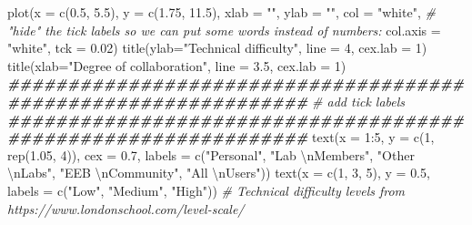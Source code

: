 \documentclass[
  11pt,
]{article}
\newenvironment{Shaded}{\begin{snugshade}}{\end{snugshade}}
\newcommand{\AttributeTok}[1]{\textcolor[rgb]{0.77,0.63,0.00}{#1}}
\newcommand{\CommentTok}[1]{\textcolor[rgb]{0.56,0.35,0.01}{\textit{#1}}}
\newcommand{\DecValTok}[1]{\textcolor[rgb]{0.00,0.00,0.81}{#1}}
\newcommand{\DocumentationTok}[1]{\textcolor[rgb]{0.56,0.35,0.01}{\textbf{\textit{#1}}}}
\newcommand{\FloatTok}[1]{\textcolor[rgb]{0.00,0.00,0.81}{#1}}
\newcommand{\FunctionTok}[1]{\textcolor[rgb]{0.00,0.00,0.00}{#1}}
\newcommand{\NormalTok}[1]{#1}
\newcommand{\SpecialCharTok}[1]{\textcolor[rgb]{0.00,0.00,0.00}{#1}}
\newcommand{\StringTok}[1]{\textcolor[rgb]{0.31,0.60,0.02}{#1}}
\begin{document}
\begin{Shaded}
\begin{Highlighting}[]
\FunctionTok{plot}\NormalTok{(}\AttributeTok{x =} \FunctionTok{c}\NormalTok{(}\FloatTok{0.5}\NormalTok{, }\FloatTok{5.5}\NormalTok{),}
     \AttributeTok{y =} \FunctionTok{c}\NormalTok{(}\FloatTok{1.75}\NormalTok{, }\FloatTok{11.5}\NormalTok{),}
     \AttributeTok{xlab =} \StringTok{""}\NormalTok{,}
     \AttributeTok{ylab =} \StringTok{""}\NormalTok{,}
     \AttributeTok{col =} \StringTok{"white"}\NormalTok{,}
     \CommentTok{\# "hide" the tick labels so we can put some words instead of numbers:}
     \AttributeTok{col.axis =} \StringTok{"white"}\NormalTok{,}
     \AttributeTok{tck =} \FloatTok{0.02}\NormalTok{)}
\FunctionTok{title}\NormalTok{(}\AttributeTok{ylab=}\StringTok{"Technical difficulty"}\NormalTok{, }\AttributeTok{line =} \DecValTok{4}\NormalTok{, }\AttributeTok{cex.lab =} \DecValTok{1}\NormalTok{)}
\FunctionTok{title}\NormalTok{(}\AttributeTok{xlab=}\StringTok{"Degree of collaboration"}\NormalTok{, }\AttributeTok{line =} \FloatTok{3.5}\NormalTok{, }\AttributeTok{cex.lab =} \DecValTok{1}\NormalTok{)}
\DocumentationTok{\#\#\#\#\#\#\#\#\#\#\#\#\#\#\#\#\#\#\#\#\#\#\#\#\#\#\#\#\#\#\#\#\#\#\#\#\#\#\#\#\#\#\#\#\#\#\#\#\#\#\#\#\#\#\#\#\#\#\#\#\#\#\#}
\CommentTok{\# add tick labels}
\DocumentationTok{\#\#\#\#\#\#\#\#\#\#\#\#\#\#\#\#\#\#\#\#\#\#\#\#\#\#\#\#\#\#\#\#\#\#\#\#\#\#\#\#\#\#\#\#\#\#\#\#\#\#\#\#\#\#\#\#\#\#\#\#\#\#\#}
\FunctionTok{text}\NormalTok{(}\AttributeTok{x =} \DecValTok{1}\SpecialCharTok{:}\DecValTok{5}\NormalTok{,}
     \AttributeTok{y =} \FunctionTok{c}\NormalTok{(}\DecValTok{1}\NormalTok{, }\FunctionTok{rep}\NormalTok{(}\FloatTok{1.05}\NormalTok{, }\DecValTok{4}\NormalTok{)),}
     \AttributeTok{cex =} \FloatTok{0.7}\NormalTok{,}
     \AttributeTok{labels =} \FunctionTok{c}\NormalTok{(}\StringTok{"Personal"}\NormalTok{,}
                \StringTok{"Lab }\SpecialCharTok{\textbackslash{}n}\StringTok{Members"}\NormalTok{,}
                \StringTok{"Other }\SpecialCharTok{\textbackslash{}n}\StringTok{Labs"}\NormalTok{,}
                \StringTok{"EEB }\SpecialCharTok{\textbackslash{}n}\StringTok{Community"}\NormalTok{,}
                \StringTok{"All }\SpecialCharTok{\textbackslash{}n}\StringTok{Users"}\NormalTok{))}
\FunctionTok{text}\NormalTok{(}\AttributeTok{x =} \FunctionTok{c}\NormalTok{(}\DecValTok{1}\NormalTok{, }\DecValTok{3}\NormalTok{, }\DecValTok{5}\NormalTok{),}
     \AttributeTok{y =} \FloatTok{0.5}\NormalTok{,}
     \AttributeTok{labels =} \FunctionTok{c}\NormalTok{(}\StringTok{"Low"}\NormalTok{, }\StringTok{"Medium"}\NormalTok{, }\StringTok{"High"}\NormalTok{))}
\CommentTok{\# Technical difficulty levels from https://www.londonschool.com/level{-}scale/}

\end{Highlighting}
\end{Shaded}
\end{document}
